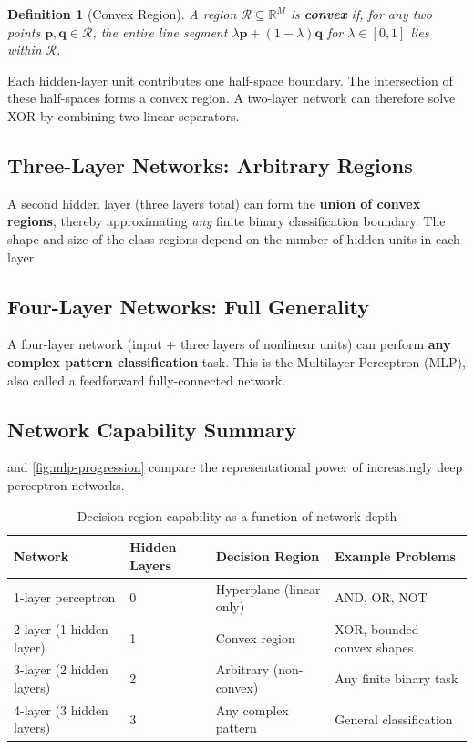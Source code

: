 \documentclass[12pt,a4paper]{article}
\newtheorem{definition}{Definition}[section]
\newcommand{\vect}[1]{\mathbf{#1}}
\newcommand{\R}{\mathbb{R}}
\begin{document}
\begin{definition}[Convex Region]
\label{def:convex}
A region $\mathcal{R} \subseteq \R^M$ is \textbf{convex} if, for any
two points $\vect{p}, \vect{q} \in \mathcal{R}$, the entire line
segment $\lambda\vect{p} + (1-\lambda)\vect{q}$ for
$\lambda \in [0,1]$ lies within $\mathcal{R}$.
\end{definition}

Each hidden-layer unit contributes one half-space boundary.
The intersection of these half-spaces forms a convex region.
A two-layer network can therefore solve XOR by combining two
linear separators.

\subsection{Three-Layer Networks: Arbitrary Regions}
\label{subsec:three-layer}

A second hidden layer (three layers total) can form the
\textbf{union of convex regions}, thereby approximating
\emph{any} finite binary classification boundary.
The shape and size of the class regions depend on the number of
hidden units in each layer.

\subsection{Four-Layer Networks: Full Generality}
\label{subsec:four-layer}

A four-layer network (input + three layers of nonlinear units)
can perform \textbf{any complex pattern classification} task.
This is the Multilayer Perceptron (MLP), also called a
feedforward fully-connected network.

\subsection{Network Capability Summary}
\label{subsec:network-summary}

 and \cref{fig:mlp-progression} compare
the representational power of increasingly deep perceptron networks.

\begin{table}[ht]
\centering
\caption{Decision region capability as a function of network depth}
\label{tab:network-capability}
\begin{tabularx}{\textwidth}{lllX}
\toprule
\textbf{Network}         & \textbf{Hidden Layers} & \textbf{Decision Region} & \textbf{Example Problems} \\
\midrule
1-layer perceptron       & 0 & Hyperplane (linear only) & AND, OR, NOT \\
2-layer (1 hidden layer) & 1 & Convex region            & XOR, bounded convex shapes \\
3-layer (2 hidden layers)& 2 & Arbitrary (non-convex)   & Any finite binary task \\
4-layer (3 hidden layers)& 3 & Any complex pattern      & General classification \\
\bottomrule
\end{tabularx}
\end{table}
\end{document}
